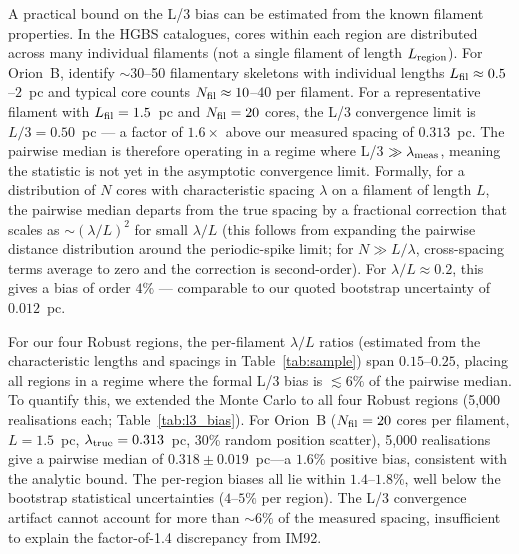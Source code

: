 \documentclass[twoside,twocolumn]{mnras}
\begin{document}
A practical bound on the L/3 bias can be estimated from the known filament properties. In the HGBS catalogues, cores within each region are distributed across many individual filaments (not a single filament of length $L_{\rm region}$). For Orion~B, \citet{Konyves2020} identify $\sim$30--50 filamentary skeletons with individual lengths $L_{\rm fil} \approx 0.5$--$2$~pc and typical core counts $N_{\rm fil} \approx 10$--$40$ per filament. For a representative filament with $L_{\rm fil} = 1.5$~pc and $N_{\rm fil} = 20$ cores, the L/3 convergence limit is $L/3 = 0.50$~pc --- a factor of $1.6\times$ above our measured spacing of $0.313$~pc. The pairwise median is therefore operating in a regime where L/3 $\gg \lambda_{\rm meas}$, meaning the statistic is not yet in the asymptotic convergence limit. Formally, for a distribution of $N$ cores with characteristic spacing $\lambda$ on a filament of length $L$, the pairwise median departs from the true spacing by a fractional correction that scales as $\sim(\lambda/L)^2$ for small $\lambda/L$ (this follows from expanding the pairwise distance distribution around the periodic-spike limit; for $N \gg L/\lambda$, cross-spacing terms average to zero and the correction is second-order). For $\lambda/L \approx 0.2$, this gives a bias of order $4\%$ --- comparable to our quoted bootstrap uncertainty of $0.012$~pc.

For our four Robust regions, the per-filament $\lambda/L$ ratios (estimated from the characteristic lengths and spacings in Table~\ref{tab:sample}) span $0.15$--$0.25$, placing all regions in a regime where the formal L/3 bias is $\lesssim 6\%$ of the pairwise median. To quantify this, we extended the Monte Carlo to all four Robust regions (5,000 realisations each; Table~\ref{tab:l3_bias}). For Orion~B ($N_{\rm fil} = 20$ cores per filament, $L = 1.5$~pc, $\lambda_{\rm true} = 0.313$~pc, 30\% random position scatter), 5,000 realisations give a pairwise median of $0.318 \pm 0.019$~pc---a $1.6\%$ positive bias, consistent with the analytic bound. The per-region biases all lie within $1.4$--$1.8\%$, well below the bootstrap statistical uncertainties ($4$--$5\%$ per region). The L/3 convergence artifact cannot account for more than $\sim 6\%$ of the measured spacing, insufficient to explain the factor-of-1.4 discrepancy from IM92.
\end{document}
